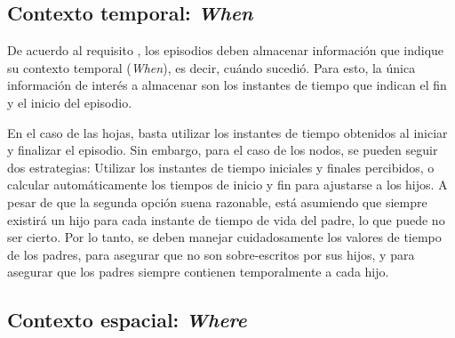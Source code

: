 \subsection{Contexto temporal: \textit{When}}\label{sec:design_ep_when}

De acuerdo al requisito , los episodios deben almacenar información que indique su contexto temporal (\textit{When}), es decir, cuándo  sucedió. Para esto, la única información de interés a almacenar son los instantes de tiempo que indican el fin y el inicio del episodio.

En el caso de las hojas, basta utilizar los instantes de tiempo obtenidos al iniciar y finalizar el episodio. Sin embargo, para el caso de los nodos, se pueden seguir dos estrategias: Utilizar los instantes de tiempo iniciales y finales percibidos, o calcular automáticamente los tiempos de inicio y fin para ajustarse a los hijos. A pesar de que la segunda opción suena razonable, está asumiendo que siempre existirá un hijo para cada instante de tiempo de vida del padre, lo que puede no ser cierto. Por lo tanto, se deben manejar cuidadosamente los valores de tiempo de los padres, para asegurar que no son sobre-escritos por sus hijos, y para asegurar que los padres siempre contienen temporalmente a cada hijo.


\subsection{Contexto espacial: \textit{Where}}\label{sec:design_ep_where}


